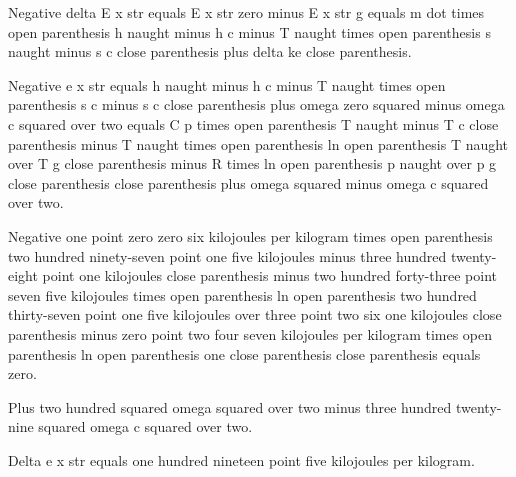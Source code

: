 Negative delta E x str equals E x str zero minus E x str g equals m dot times open parenthesis h naught minus h c minus T naught times open parenthesis s naught minus s c close parenthesis plus delta ke close parenthesis.

Negative e x str equals h naught minus h c minus T naught times open parenthesis s c minus s c close parenthesis plus omega zero squared minus omega c squared over two equals C p times open parenthesis T naught minus T c close parenthesis minus T naught times open parenthesis ln open parenthesis T naught over T g close parenthesis minus R times ln open parenthesis p naught over p g close parenthesis close parenthesis plus omega squared minus omega c squared over two.

Negative one point zero zero six kilojoules per kilogram times open parenthesis two hundred ninety-seven point one five kilojoules minus three hundred twenty-eight point one kilojoules close parenthesis minus two hundred forty-three point seven five kilojoules times open parenthesis ln open parenthesis two hundred thirty-seven point one five kilojoules over three point two six one kilojoules close parenthesis minus zero point two four seven kilojoules per kilogram times open parenthesis ln open parenthesis one close parenthesis close parenthesis equals zero.

Plus two hundred squared omega squared over two minus three hundred twenty-nine squared omega c squared over two.

Delta e x str equals one hundred nineteen point five kilojoules per kilogram.